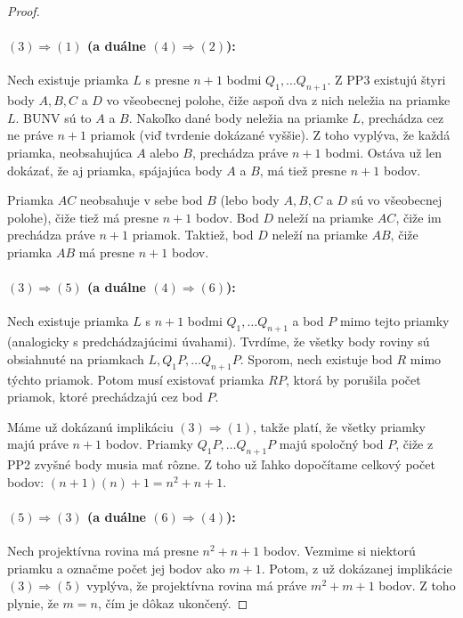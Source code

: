 \begin{proof}
\paragraph{$(3) \Longrightarrow (1)$ (a duálne $(4) \Longrightarrow (2)$):} 
Nech existuje priamka $L$ s presne $n+1$ bodmi $Q_1, \ldots Q_{n+1}$. 
Z PP3 existujú štyri body $A, B, C$ a $D$ vo všeobecnej polohe, čiže aspoň dva z nich neležia na priamke $L$.
BUNV sú to $A$ a $B$.
Nakoľko dané body neležia na priamke $L$, prechádza cez ne práve $n+1$ priamok (viď tvrdenie dokázané vyššie).
Z toho vyplýva, že každá priamka, neobsahujúca $A$ alebo $B$, prechádza práve $n+1$ bodmi.
Ostáva už len dokázať, že aj priamka, spájajúca body $A$ a $B$, má tiež presne $n+1$ bodov.

Priamka $AC$ neobsahuje v sebe bod $B$ (lebo body $A,B,C$ a $D$ sú vo všeobecnej polohe), čiže tiež má presne $n+1$ bodov. 
Bod $D$ neleží na priamke $AC$, čiže im prechádza práve $n+1$ priamok.
Taktiež, bod $D$ neleží na priamke $AB$, čiže priamka $AB$ má presne $n+1$ bodov.

\paragraph{$(3) \Longrightarrow (5)$ (a duálne $(4) \Longrightarrow (6)$):}
Nech existuje priamka $L$ s $n+1$ bodmi $Q_1, \ldots Q_{n+1}$ a bod $P$ mimo tejto priamky (analogicky s predchádzajúcimi úvahami). 
Tvrdíme, že všetky body roviny sú obsiahnuté na priamkach $L, Q_1 P, \ldots Q_{n+1} P $.
Sporom, nech existuje bod $R$ mimo týchto priamok.
Potom musí existovať priamka $RP$, ktorá by porušila počet priamok, ktoré prechádzajú cez bod $P$.

Máme už dokázanú implikáciu $(3) \Longrightarrow (1)$, takže platí, že všetky priamky majú práve $n+1$ bodov.
Priamky $ Q_1 P, \ldots Q_{n+1} P $ majú spoločný bod $P$, čiže z PP2 zvyšné body musia mať rôzne.
Z toho už ľahko dopočítame celkový počet bodov: $(n+1) (n) + 1 = n^2 + n + 1$.

\paragraph{$(5) \Longrightarrow (3)$ (a duálne $(6) \Longrightarrow (4)$):}
Nech projektívna rovina má presne $n^2 + n + 1$ bodov.
Vezmime si niektorú priamku a označme počet jej bodov ako $m+1$.
Potom, z už dokázanej implikácie $(3) \Longrightarrow (5)$ vyplýva, že projektívna rovina má práve $m^2 + m + 1$ bodov.
Z toho plynie, že $m = n$, čím je dôkaz ukončený.
\end{proof}



